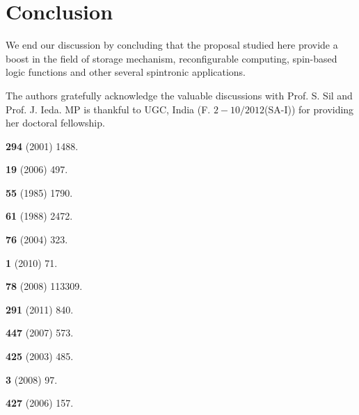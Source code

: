 \documentclass[doublecol]{epl2}
\begin{document}
\section{Conclusion}

We end our discussion by concluding that the proposal studied here provide
a boost in the field of storage mechanism, reconfigurable computing, 
spin-based logic functions and other several spintronic applications.

\acknowledgments

The authors gratefully acknowledge the valuable discussions with 
Prof. S. Sil and Prof. J. Ieda. MP is thankful to UGC, India 
(F. $2-10/2012$(SA-I)) for providing her doctoral fellowship.

\begin{thebibliography}{0}

   
\textbf{294} (2001) 1488.

 
 \textbf{19} (2006) 497.

  
\textbf{55} (1985) 1790.  
 
   
\textbf{61} (1988) 2472.

  
 \textbf{76} (2004) 323.

 
 \textbf{1} (2010) 71.

 
 \textbf{78} (2008) 113309.

   \textbf{291} (2011) 840.

   \textbf{447} (2007) 573.

 
 \textbf{425} (2003) 485.

   
\textbf{3} (2008) 97.

  
 \textbf{427} (2006) 157.


\end{thebibliography}
\end{document}
